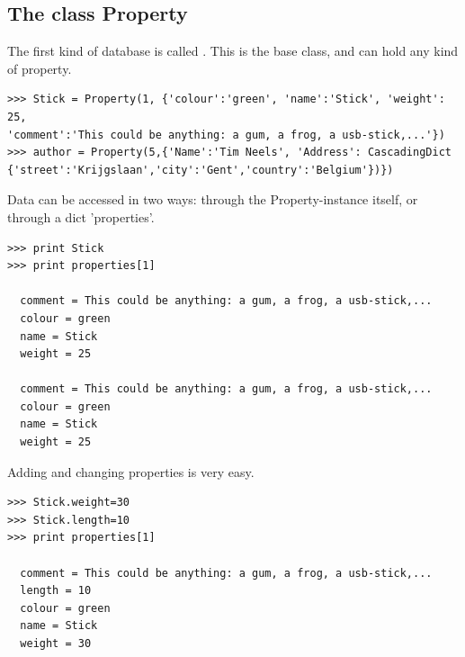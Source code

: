\subsection{The class Property}
The first kind of database is called . This is the base class, and can hold any kind of property.
\begin{verbatim}
>>> Stick = Property(1, {'colour':'green', 'name':'Stick', 'weight': 25, 
'comment':'This could be anything: a gum, a frog, a usb-stick,...'})
>>> author = Property(5,{'Name':'Tim Neels', 'Address': CascadingDict
{'street':'Krijgslaan','city':'Gent','country':'Belgium'})})
\end{verbatim}
Data can be accessed in two ways: through the Property-instance itself, or through a dict 'properties'. 
\begin{verbatim}    
>>> print Stick
>>> print properties[1] 

  comment = This could be anything: a gum, a frog, a usb-stick,...
  colour = green
  name = Stick
  weight = 25

  comment = This could be anything: a gum, a frog, a usb-stick,...
  colour = green
  name = Stick
  weight = 25
\end{verbatim}
Adding and changing properties is very easy.
\begin{verbatim}  
>>> Stick.weight=30
>>> Stick.length=10
>>> print properties[1]

  comment = This could be anything: a gum, a frog, a usb-stick,...
  length = 10
  colour = green
  name = Stick
  weight = 30
\end{verbatim}

